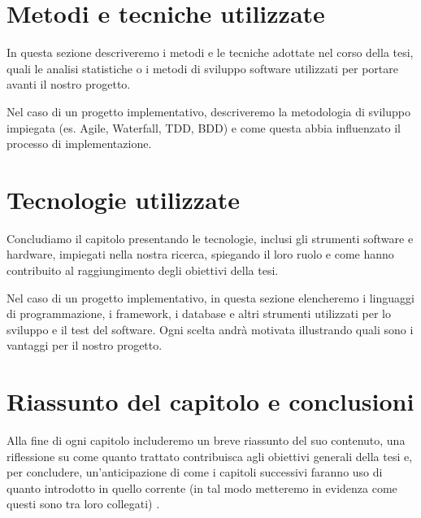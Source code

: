 \section{Metodi e tecniche utilizzate}

In questa sezione descriveremo i metodi e le tecniche adottate nel corso della tesi, quali le analisi statistiche o i metodi di sviluppo software utilizzati per portare avanti il nostro progetto.

\medskip

Nel caso di un progetto implementativo, descriveremo la metodologia di sviluppo impiegata (es. Agile, Waterfall, TDD, BDD) e come questa abbia influenzato il processo di implementazione.

\section{Tecnologie utilizzate}

Concludiamo il capitolo presentando le tecnologie, inclusi gli strumenti software e hardware, impiegati nella nostra ricerca, spiegando il loro ruolo e come hanno contribuito al raggiungimento degli obiettivi della tesi.

\medskip

Nel caso di un progetto implementativo, in questa sezione elencheremo i linguaggi di programmazione, i framework, i database e altri strumenti utilizzati per lo sviluppo e il test del software. Ogni scelta andrà motivata illustrando quali sono i vantaggi per il nostro progetto.

\section{Riassunto del capitolo e conclusioni}

Alla fine di ogni capitolo includeremo un breve riassunto del suo contenuto, una riflessione su come quanto trattato contribuisca agli obiettivi generali della tesi e, per concludere, un'anticipazione di come i capitoli successivi faranno uso di quanto introdotto in quello corrente (in tal modo metteremo in evidenza come questi sono tra loro collegati) \cite{zobel2015writing}.